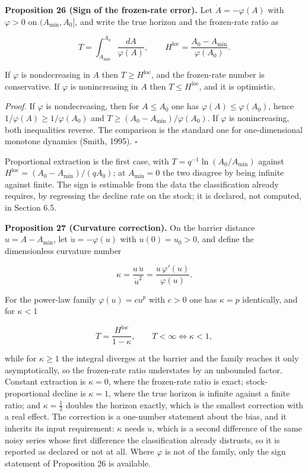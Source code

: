 \documentclass[11pt]{article}
\begin{document}
\textbf{Proposition 26 (Sign of the frozen-rate error).} Let \(\dot A=-\varphi(A)\) with \(\varphi>0\) on \((A_{\min},A_0]\), and write the true horizon and the frozen-rate ratio as 

$$T=\int_{A_{\min}}^{A_0}\frac{dA}{\varphi(A)}, \qquad H^{\mathrm{loc}}=\frac{A_0-A_{\min}}{\varphi(A_0)} .$$

 If \(\varphi\) is nondecreasing in \(A\) then \(T\ge H^{\mathrm{loc}}\), and the frozen-rate number is conservative. If \(\varphi\) is nonincreasing in \(A\) then \(T\le H^{\mathrm{loc}}\), and it is optimistic.

\emph{Proof.} If \(\varphi\) is nondecreasing, then for \(A\le A_0\) one has \(\varphi(A)\le\varphi(A_0)\), hence \(1/\varphi(A)\ge1/\varphi(A_0)\) and \(T\ge(A_0-A_{\min})/\varphi(A_0)\). If \(\varphi\) is nonincreasing, both inequalities reverse. The comparison is the standard one for one-dimensional monotone dynamics (Smith, 1995). \(\square\)

Proportional extraction is the first case, with \(T=\allowbreak{}q^{-1}\ln(A_0/\allowbreak{}A_{\min})\) against \(H^{\mathrm{loc}}=\allowbreak{}(A_0-A_{\min})/(qA_0)\); at \(A_{\min}=0\) the two disagree by being infinite against finite. The sign is estimable from the data the classification already requires, by regressing the decline rate on the stock; it is declared, not computed, in Section 6.5.

\textbf{Proposition 27 (Curvature correction).} On the barrier distance \(u=A-A_{\min}\), let \(\dot u=-\varphi(u)\) with \(u(0)=u_0>0\), and define the dimensionless curvature number 

$$\kappa=\frac{u\,\ddot u}{\dot u^{2}}=\frac{u\,\varphi'(u)}{\varphi(u)} .$$

 For the power-law family \(\varphi(u)=cu^{p}\) with \(c>0\) one has \(\kappa=p\) identically, and for \(\kappa<1\) 

$$T=\frac{H^{\mathrm{loc}}}{1-\kappa}, \qquad T<\infty\iff\kappa<1,$$

 while for \(\kappa\ge1\) the integral diverges at the barrier and the family reaches it only asymptotically, so the frozen-rate ratio understates by an unbounded factor. Constant extraction is \(\kappa=0\), where the frozen-rate ratio is exact; stock-proportional decline is \(\kappa=1\), where the true horizon is infinite against a finite ratio; and \(\kappa=\tfrac12\) doubles the horizon exactly, which is the smallest correction with a real effect. The correction is a one-number statement about the bias, and it inherits its input requirement: \(\kappa\) needs \(\ddot u\), which is a second difference of the same noisy series whose first difference the classification already distrusts, so it is reported as declared or not at all. Where \(\varphi\) is not of the family, only the sign statement of Proposition 26 is available.
\end{document}
